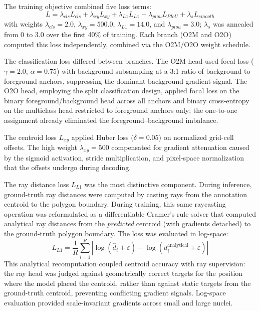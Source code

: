 \documentclass[conference]{IEEEtran}
\begin{document}
The training objective combined five loss terms:
\begin{equation}
L = \lambda_{cls} L_{cls} + \lambda_{xy} L_{xy} + \lambda_{L1} L_{L1} + \lambda_{piou} L_{PIoU} + \lambda_{s} L_{smooth}
\end{equation}
with weights $\lambda_{cls} = 2.0$, $\lambda_{xy} = 500.0$, $\lambda_{L1} = 14.0$, and $\lambda_{piou} = 3.0$; $\lambda_{s}$ was annealed from 0 to 3.0 over the first 40\% of training. Each branch (O2M and O2O) computed this loss independently, combined via the O2M/O2O weight schedule.

The classification loss differed between branches. The O2M head used focal loss ($\gamma = 2.0$, $\alpha = 0.75$) with background subsampling at a 3:1 ratio of background to foreground anchors, suppressing the dominant background gradient signal. The O2O head, employing the split classification design, applied focal loss on the binary foreground/background head across all anchors and binary cross-entropy on the multiclass head restricted to foreground anchors only; the one-to-one assignment already eliminated the foreground--background imbalance.

The centroid loss $L_{xy}$ applied Huber loss ($\delta = 0.05$) on normalized grid-cell offsets. The high weight $\lambda_{xy} = 500$ compensated for gradient attenuation caused by the sigmoid activation, stride multiplication, and pixel-space normalization that the offsets undergo during decoding.

The ray distance loss $L_{L1}$ was the most distinctive component. During inference, ground-truth ray distances were computed by casting rays from the annotation centroid to the polygon boundary. During training, this same raycasting operation was reformulated as a differentiable Cramer's rule solver that computed analytical ray distances from the \emph{predicted} centroid (with gradients detached) to the ground-truth polygon boundary. The loss was evaluated in log-space:
\begin{equation}
L_{L1} = \frac{1}{R} \sum_{i=1}^{R} |\log(\hat{d}_i + \varepsilon) - \log(d_i^{\text{analytical}} + \varepsilon)|
\end{equation}
This analytical recomputation coupled centroid accuracy with ray supervision: the ray head was judged against geometrically correct targets for the position where the model placed the centroid, rather than against static targets from the ground-truth centroid, preventing conflicting gradient signals. Log-space evaluation provided scale-invariant gradients across small and large nuclei.
\end{document}
